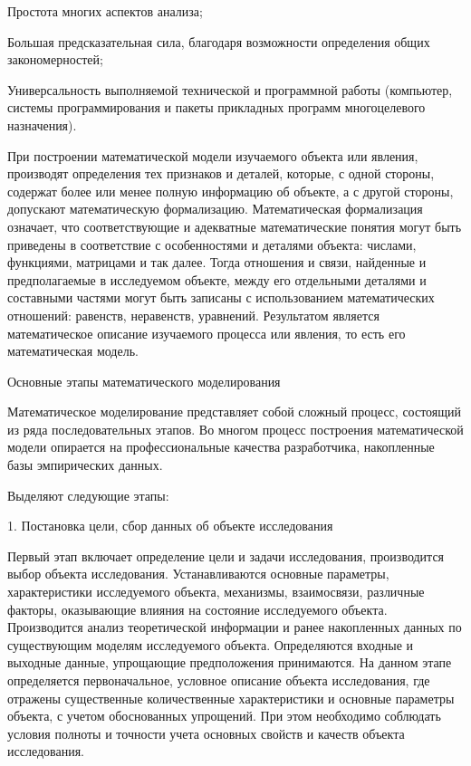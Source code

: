 Простота многих аспектов анализа;


Большая предсказательная сила, благодаря возможности определения общих закономерностей;


Универсальность выполняемой технической и программной работы (компьютер, системы программирования и пакеты прикладных программ многоцелевого назначения).\cite{b6}



При построении математической модели изучаемого объекта или явления, производят определения тех  признаков и деталей, которые, с одной стороны, содержат более или менее полную информацию об объекте, а с другой стороны, допускают математическую формализацию. Математическая формализация означает, что соответствующие и адекватные математические понятия могут быть приведены в соответствие с особенностями и деталями объекта: числами, функциями, матрицами и так далее. Тогда отношения и связи, найденные и предполагаемые в исследуемом объекте, между его отдельными деталями и составными частями могут быть записаны с использованием математических отношений: равенств, неравенств, уравнений. Результатом является математическое описание изучаемого процесса или явления, то есть его математическая модель.



Основные этапы математического моделирования


Математическое моделирование представляет собой сложный процесс, состоящий из ряда последовательных этапов.  Во многом процесс построения математической модели опирается на профессиональные качества разработчика, накопленные базы эмпирических данных.


Выделяют следующие этапы: 


1.	Постановка цели, сбор данных об объекте исследования



Первый этап включает определение цели и задачи исследования, производится выбор объекта исследования. Устанавливаются основные параметры, характеристики исследуемого объекта, механизмы, взаимосвязи, различные факторы, оказывающие влияния на состояние исследуемого объекта. Производится анализ теоретической информации и ранее накопленных данных по существующим моделям исследуемого объекта. Определяются входные и выходные данные, упрощающие предположения принимаются. На данном этапе определяется первоначальное, условное описание объекта исследования, где отражены существенные количественные характеристики и основные параметры объекта, с учетом обоснованных упрощений. При этом необходимо соблюдать условия полноты и точности учета основных свойств и качеств объекта исследования.

